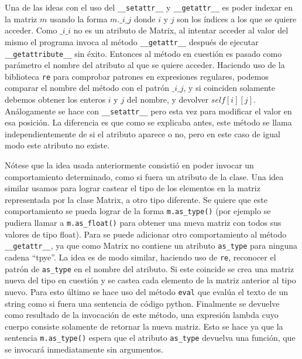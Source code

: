 \documentclass[10pt]{article}
\newcommand{\mgc}[1]{\texttt{\_\_#1\_\_}}
\newcommand{\csl}[1]{\texttt{#1}}
\begin{document}
Una de las ideas con el uso del \mgc{setattr} y \mgc{getattr} es poder indexar en la matriz $m$ usando la forma \csl{$m.\_i\_j$} donde $i$ y $j$ son los \'indices a los que se quiere acceder. Como \csl{$\_i\_i$} no es un atributo de Matrix, al intentar acceder al valor del mismo el programa invoca al m\'etodo \mgc{getattr} despu\'es de ejecutar \mgc{getattribute} sin \'exito. Entonces al m\'etodo en cuesti\'on es pasado como par\'ametro el nombre del atributo al que se quiere acceder. Haciendo uso de la biblioteca \csl{re} para comprobar patrones en expresiones regulares, podemos comparar el nombre del m\'etodo con el patr\'on \csl{$\_i\_j$}, y si coinciden solamente debemos obtener los enteros $i$ y $j$ del nombre, y devolver \csl{$self[i][j]$}. An\'alogamente se hace con \mgc{setattr} pero esta vez para modificar el valor en esa posici\'on. La diferencia es que como se explicaba antes, este m\'etodo se llama independientemente de si el atributo aparece o no, pero en este caso de igual modo este atributo no existe.

N\'otese que la idea usada anteriormente consisti\'o en poder invocar un comportamiento determinado, como si fuera un atributo de la clase. Una idea similar usamos para lograr castear el tipo de los elementos en la matriz representada por la clase Matrix, a otro tipo diferente. Se quiere que este comportamiento se pueda lograr de la forma \csl{m.as\_type()} (por ejemplo se pudiera llamar a \csl{m.as\_float()} para obtener una nueva matriz con todos sus valores de tipo float). Para se puede adicionar otro comportamiento al m\'etodo \mgc{getattr}, ya que como Matrix no contiene un atributo \csl{as\_type} para ninguna cadena ``tpye''. La idea es de modo similar, haciendo uso de \csl{re}, reconocer el patr\'on de \csl{as\_type} en el nombre del atributo. Si este coincide se crea una matriz nueva del tipo en cuesti\'on y se castea cada elemento de la matriz anterior al tipo nuevo. Para esto \'ultimo se hace uso del m\'etodo \csl{eval} que eval\'ua el texto de un string como si fuera una sentencia de c\'odigo python. Finalmente se devuelve como resultado de la invocaci\'on de este m\'etodo, una expresi\'on lambda cuyo cuerpo consiste solamente de retornar la nueva matriz. Esto se hace ya que la sentencia \csl{m.as\_type()} espera que el atributo \csl{as\_type} devuelva una funci\'on, que se invocar\'a inmediatamente sin argumentos.
\end{document}

